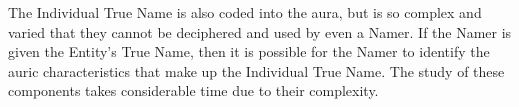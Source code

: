 \begin{multicols*}{3}
The Individual True Name is also coded into the aura, but is so
complex and varied that they cannot be deciphered and used by even a
Namer. If the Namer is given the Entity's True Name, then it is
possible for the Namer to identify the auric characteristics that make
up the Individual True Name. The study of these components takes
considerable time due to their complexity.

\end{multicols*}
